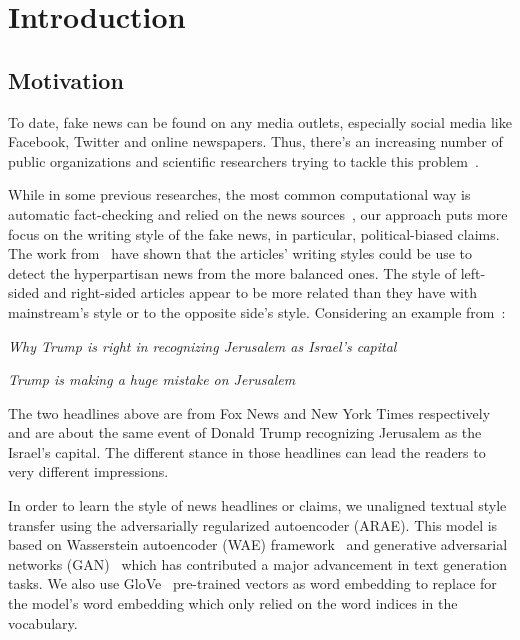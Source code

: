 
\chapter{Introduction} %
\label{Chapter1}


\section{Motivation}
To date, fake news can be found on any media outlets, especially social media like Facebook, Twitter and online newspapers. Thus, there's an increasing
number of public organizations and scientific researchers trying to tackle this problem~\cite{perez2017automatic}. 

While in some previous researches, the most common computational way is automatic fact-checking and relied on the news sources~\cite{perez2017automatic}, 
our approach puts more focus on the writing style of the fake news, in particular, political-biased claims. The work from~\cite{potthast2018stylometric} 
have shown that the articles' writing styles could be use to detect the hyperpartisan news from the more balanced ones. The style of left-sided and right-sided 
articles appear to be more related than they have with mainstream's style or to the opposite side's style. Considering an example from~\cite{chen-etal-2018-learning}:

\textit{Why Trump is right in recognizing Jerusalem as
Israel’s capital}

\textit{Trump is making a huge mistake on Jerusalem}

The two headlines above are from Fox News and New York Times respectively and are about the same event of Donald Trump recognizing Jerusalem as the
Israel's capital. The different stance in those headlines can lead the readers to very different impressions.

In order to learn the style of news headlines or claims, we unaligned textual style transfer using the adversarially regularized autoencoder (ARAE). This model 
is based on Wasserstein autoencoder (WAE) framework~\cite{Tolstikhin2018WassersteinA} and generative adversarial networks (GAN)~\cite{NIPS2014_5423} which has 
contributed a major advancement in text generation tasks. We also use GloVe~\cite{glove} pre-trained vectors as word embedding to replace for the model's word embedding
which only relied on the word indices in the vocabulary.

